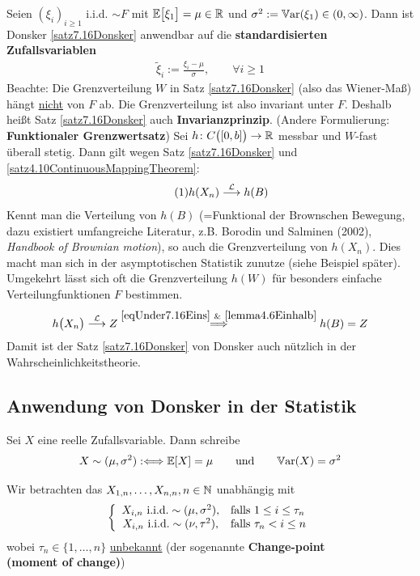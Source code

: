 Seien $(\xi_i)_{i\geq1}$ i.i.d. $\sim F$ mit $\mathbb{E}\big[\xi_1\big]=\mu\in\mathbb{R}$ und $\sigma^2:=\mathbb{V}\text{ar}(\xi_1)\in(0,\infty)$. 
Dann ist Donsker \ref{satz7.16Donsker} anwendbar auf die \textbf{standardisierten Zufallsvariablen}
\begin{align*}
	\tilde{\xi}_i:=\frac{\xi_i-\mu}{\sigma},\qquad\forall i\geq1
\end{align*}
Beachte: Die Grenzverteilung $W$ in Satz \ref{satz7.16Donsker} (also das Wiener-Maß) hängt \ul{nicht} von $F$ ab. 
Die Grenzverteilung ist also invariant unter $F$. Deshalb heißt Satz \ref{satz7.16Donsker} auch \textbf{Invarianzprinzip}. 
(Andere Formulierung: \textbf{Funktionaler Grenzwertsatz})\nl
Sei $h\colon C\big([0,b]\big)\to\mathbb{R}$ messbar und $W$-fast überall stetig. 
Dann gilt wegen Satz \ref{satz7.16Donsker} und \ref{satz4.10ContinuousMappingTheorem}:
\begin{align}\label{eqUnder7.16Eins}\tag{1}
	h(X_n)\stackrel{\mathcal{L}}{\longrightarrow} h(B)
\end{align}
Kennt man die Verteilung von $h(B)$ (=Funktional der Brownschen Bewegung, dazu existiert umfangreiche Literatur, z.B. Borodin und Salminen (2002),
\textit{Handbook of Brownian motion}), so auch die Grenzverteilung von $h(X_n)$. Dies macht man sich in der asymptotischen Statistik zunutze
(siehe Beispiel später).
Umgekehrt lässt sich oft die Grenzverteilung $h(W)$ für besonders einfache Verteilungfunktionen $F$ bestimmen.
\begin{align*}
	h\big(X_n\big)\stackrel{\mathcal{L}}{\longrightarrow}Z
	\overset{\eqref{eqUnder7.16Eins}~\&~\ref{lemma4.6Einhalb}}{\implies}
	h(B)=Z
\end{align*}
Damit ist der Satz \ref{satz7.16Donsker} von Donsker auch nützlich in der Wahrscheinlichkeitstheorie.

\subsection{Anwendung von Donsker in der Statistik}
\begin{notation}
	Sei $X$ eine reelle Zufallsvariable. Dann schreibe
	\begin{align*}
		X\sim(\mu,\sigma^2):\Longleftrightarrow\mathbb{E}[X]=\mu\qquad\text{und}\qquad\mathbb{V}\text{ar}(X)=\sigma^2
	\end{align*}
\end{notation}

Wir betrachten das 
$X_{1,n},\ldots,X_{n,n},n\in\mathbb{N}$ unabhängig mit 
\begin{align*}
	\left\lbrace\begin{array}{cl}
		X_{i,n}\text{ i.i.d.}\sim(\mu,\sigma^2), &\text{falls } 1\leq i\leq\tau_n\\
		X_{i,n}\text{ i.i.d.}\sim(\nu,\tau^2), &\text{falls } \tau_n< i\leq n
	\end{array}\right.
\end{align*}
wobei $\tau_n\in\lbrace1,\ldots,n\rbrace$ \ul{unbekannt} (der sogenannte \textbf{Change-point\\ (moment of change)}) 

